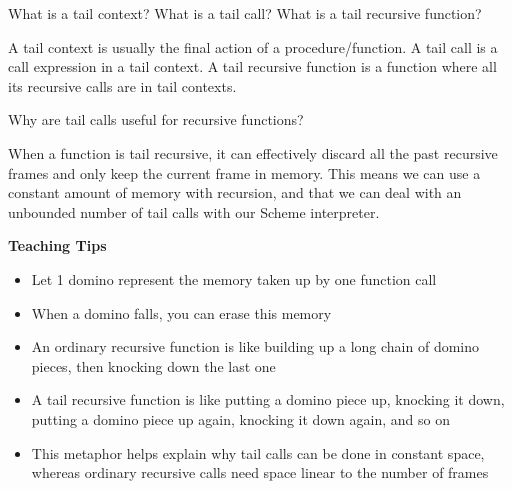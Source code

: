 \begin{blocksection}
\question What is a tail context? What is a tail call? What is a tail recursive function?

\begin{solution}
A tail context is usually the final action of a procedure/function.
\newline
A tail call is a call expression in a tail context.
\newline
A tail recursive function is a function where all its recursive calls are in tail contexts. \newline
\newline
\end{solution}

\vspace{3cm}

\question Why are tail calls useful for recursive functions?

\begin{solution}
When a function is tail recursive, it can effectively discard all the past recursive frames and only keep the current frame in memory. This means we can use a constant amount of memory with recursion, and that we can deal with an unbounded
number of tail calls with our Scheme interpreter.
\end{solution}

\begin{guide}
    \vspace{.5cm}
\textbf{Teaching Tips}
  \begin{itemize}
    \item Let 1 domino represent the memory taken up by one function call
    \item When a domino falls, you can erase this memory
    \item An ordinary recursive function is like building up a long chain of domino pieces, then knocking down the last one
    \item A tail recursive function is like putting a domino piece up, knocking it down, putting a domino piece up again, knocking it down again, and so on
    \item This metaphor helps explain why tail calls can be done in constant space, whereas ordinary recursive calls need space linear to the number of frames
  \end{itemize}
\end{guide}

\end{blocksection}
